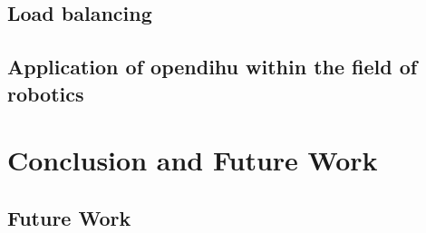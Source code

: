 \section{Load balancing}
\section{Application of opendihu within the field of robotics}

\chapter{Conclusion and Future Work}\label{sec:conclusion_and_future_work}

\section{Future Work}\label{sec:future_work}
 




